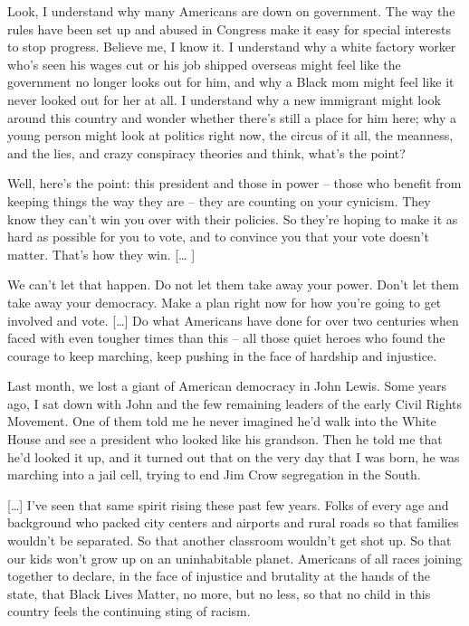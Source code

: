\documentclass[10pt,a4paper]{article}
\begin{document}
Look, I understand why many Americans are down on government. The way the rules have been set up and abused in Congress make it easy for special interests to stop progress. Believe me, I know it. I understand why a white factory worker who's seen his wages cut or his job shipped overseas might feel like the government no longer looks out for him, and why a Black mom might feel like it never looked out for her at all. I understand why a new immigrant might look around this country and wonder whether there's still a place for him here; why a young person might look at politics right now, the circus of it all, the meanness, and the lies, and crazy conspiracy theories and think, what's the point?

Well, here's the point: this president and those in power -- those who benefit from keeping things the way they are -- they are counting on your cynicism. They know they can't win you over with their policies. So they're hoping to make it as hard as possible for you to vote, and to convince you that your vote doesn't matter. That's how they win. [… ] 

We can't let that happen. Do not let them take away your power. Don't let them take away your democracy. Make a plan right now for how you're going to get involved and vote. […] Do what Americans have done for over two centuries when faced with even tougher times than this -- all those quiet heroes who found the courage to keep marching, keep pushing in the face of hardship and injustice.

Last month, we lost a giant of American democracy in John Lewis. Some years ago, I sat down with John and the few remaining leaders of the early Civil Rights Movement. One of them told me he never imagined he'd walk into the White House and see a president who looked like his grandson. Then he told me that he'd looked it up, and it turned out that on the very day that I was born, he was marching into a jail cell, trying to end Jim Crow segregation in the South.

[…] I've seen that same spirit rising these past few years. Folks of every age and background who packed city centers and airports and rural roads so that families wouldn't be separated. So that another classroom wouldn't get shot up. So that our kids won't grow up on an uninhabitable planet. Americans of all races joining together to declare, in the face of injustice and brutality at the hands of the state, that Black Lives Matter, no more, but no less, so that no child in this country feels the continuing sting of racism.
\end{document}
